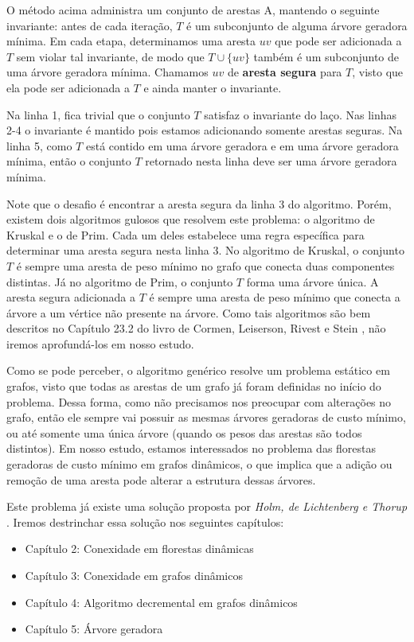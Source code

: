 O método acima administra um conjunto de arestas A, mantendo o seguinte invariante: antes de cada iteração, $T$ é um subconjunto de alguma árvore geradora mínima. Em cada etapa, determinamos uma aresta $uv$ que pode ser adicionada a $T$ sem violar tal invariante, de modo que $T \cup \{uv\}$ também é um subconjunto de uma árvore geradora mínima. Chamamos $uv$ de \textbf{aresta segura} para $T$, visto que ela pode ser adicionada a $T$ e ainda manter o invariante. 

Na linha 1, fica trivial que o conjunto $T$ satisfaz o invariante do laço. Nas linhas 2-4 o invariante é mantido pois estamos adicionando somente arestas seguras. Na linha 5, como $T$ está contido em uma árvore geradora e em uma árvore geradora mínima, então o conjunto $T$ retornado nesta linha deve ser uma árvore geradora mínima. 

Note que o desafio é encontrar a aresta segura da linha 3 do algoritmo. Porém, existem dois algoritmos gulosos que resolvem este problema: o algoritmo de Kruskal e o de Prim. Cada um deles estabelece uma regra específica para determinar uma aresta segura nesta linha 3. No algoritmo de Kruskal, o conjunto $T$ é sempre uma aresta de peso mínimo no grafo que conecta duas componentes distintas. Já no algoritmo de Prim, o conjunto $T$ forma uma árvore única. A aresta segura adicionada a $T$ é sempre uma aresta de peso mínimo que conecta a árvore a um vértice não presente na árvore. Como tais algoritmos são bem descritos no Capítulo 23.2 do livro de Cormen, Leiserson, Rivest e Stein \cite{clrs}, não iremos aprofundá-los em nosso estudo. 

Como se pode perceber, o algoritmo genérico resolve um problema estático em grafos, visto que todas as arestas de um grafo já foram definidas no início do problema. Dessa forma, como não precisamos nos preocupar com alterações no grafo, então ele sempre vai possuir as mesmas árvores geradoras de custo mínimo, ou até somente uma única árvore (quando os pesos das arestas são todos distintos). Em nosso estudo, estamos interessados no problema das florestas geradoras de custo mínimo em grafos dinâmicos, o que implica que a adição ou remoção de uma aresta pode alterar a estrutura dessas árvores. 

Este problema já existe uma solução proposta por \textit{Holm, de Lichtenberg e Thorup} \cite{jacob_holm}. Iremos destrinchar essa solução nos seguintes capítulos:

\begin{itemize}
    \item Capítulo 2: Conexidade em florestas dinâmicas
    \item Capítulo 3: Conexidade em grafos dinâmicos
    \item Capítulo 4: Algoritmo decremental em grafos dinâmicos
    \item Capítulo 5: Árvore geradora   
\end{itemize}

